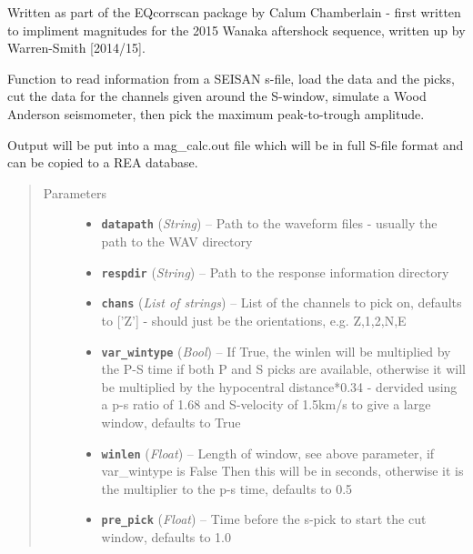 \documentclass[a4paper,10pt,english]{sphinxmanual}
\begin{document}
Written as part of the EQcorrscan package by Calum Chamberlain - first written
to impliment magnitudes for the 2015 Wanaka aftershock sequence, written up
by Warren-Smith {[}2014/15{]}.

\begin{fulllineitems}
\label{modules:mag_calc.Amp_pick_sfile}
Function to read information from a SEISAN s-file, load the data and the
picks, cut the data for the channels given around the S-window, simulate
a Wood Anderson seismometer, then pick the maximum peak-to-trough
amplitude.

Output will be put into a mag\_calc.out file which will be in full S-file
format and can be copied to a REA database.
\begin{quote}\begin{description}
\item[{Parameters}] \leavevmode\begin{itemize}
\item {} 
\textbf{\texttt{datapath}} (\emph{String}) -- Path to the waveform files - usually the path to the WAV directory

\item {} 
\textbf{\texttt{respdir}} (\emph{String}) -- Path to the response information directory

\item {} 
\textbf{\texttt{chans}} (\emph{List of strings}) -- List of the channels to pick on, defaults to {[}'Z'{]} - should
just be the orientations, e.g. Z,1,2,N,E

\item {} 
\textbf{\texttt{var\_wintype}} (\emph{Bool}) -- If True, the winlen will be
multiplied by the P-S time if both P and S picks are
available, otherwise it will be multiplied by the hypocentral
distance*0.34 - dervided using a p-s ratio of 1.68 and
S-velocity of 1.5km/s to give a large window, defaults to True

\item {} 
\textbf{\texttt{winlen}} (\emph{Float}) -- Length of window, see above parameter, if var\_wintype is False
Then this will be in seconds, otherwise it is the multiplier
to the p-s time, defaults to 0.5

\item {} 
\textbf{\texttt{pre\_pick}} (\emph{Float}) -- Time before the s-pick to start the cut window, defaults
to 1.0


\end{itemize}
\end{description}
\end{quote}
\end{fulllineitems}
\end{document}
